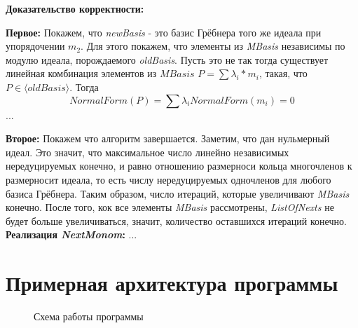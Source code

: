 \documentclass{article}
\begin{document}
    \newpage
    \textbf{Доказательство корректности:}

        \textbf{Первое:} Покажем, что \textit{newBasis} - это базис Грёбнера того же идеала при упорядочении $m_2$. 
        Для этого покажем, что элементы из \textit{MBasis} независимы по модулю идеала, порождаемого \textit{oldBasis}. Пусть это не так
        тогда существует линейная комбинация элементов из $MBasis$ $P = \sum \lambda_i*m_i$, такая, что $P\in \langle oldBasis\rangle$. Тогда
        $$NormalForm(P) = \sum \lambda_i NormalForm(m_i) = 0$$
        ...

        \textbf{Второе:} Покажем что алгоритм завершается. 
        Заметим, что дан нульмерный идеал. Это значит, что максимальное число линейно независимых нередуцируемых конечно, и равно
        отношению размерноси кольца многочленов к размерносит идеала, то есть числу нередуцируемых одночленов для любого базиса Грёбнера.
        Таким образом, число итераций, которые увеличивают \textit{MBasis} конечно. После того, кок все элементы \textit{MBasis} рассмотрены,
        \textit{ListOfNexts} не будет больше увеличиваться, значит, количество оставшихся итераций конечно.
    \newpage
    \textbf{Реализация \textit{NextMonom}:}
    ...
    
    \newpage
\section{Примерная архитектура программы}

\begin{figure}[h!]
    \caption{Схема работы программы}
\end{figure}
\newpage
\end{document}
